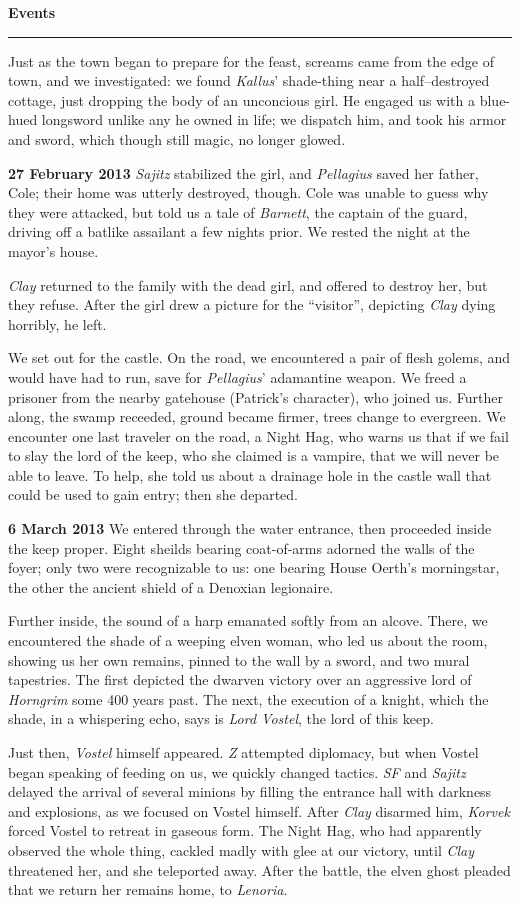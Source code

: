 \documentclass[letterpaper]{article}
\newcommand{\e}[1]{\emph{#1}}
\newcommand{\B}[1]{\textbf{#1}}
\newenvironment{notesection}[1]
{ {\huge \B{#1}}\hrule\vspace{0.5em}\begingroup\fontsize{9pt}{12pt}\selectfont}
{\endgroup}
\begin{document}
\begin{notesection}{Events}
Just as the town began to prepare for the feast, screams came from the edge of town, and we investigated: we found \e{Kallus}' shade-thing near a half--destroyed cottage, just dropping the body of an unconcious girl.  He engaged us with a blue-hued longsword unlike any he owned in life; we dispatch him, and took his armor and sword, which though still magic, no longer glowed.

\B{27 February 2013} \e{Sajitz} stabilized the girl, and \e{Pellagius} saved her father, Cole; their home was utterly destroyed, though.  Cole was unable to guess why they were attacked, but told us a tale of \e{Barnett}, the captain of the guard, driving off a batlike assailant a few nights prior. We rested the night at the mayor's house.

\e{Clay} returned to the family with the dead girl, and offered to destroy her, but they refuse.  After the girl drew a picture for the ``visitor'', depicting \e{Clay} dying horribly, he left.

We set out for the castle. On the road, we encountered a pair of flesh golems, and would have had to run, save for \e{Pellagius}' adamantine weapon.  We freed a prisoner from the nearby gatehouse (Patrick's character), who joined us.  Further along, the swamp receeded, ground became firmer, trees change to evergreen.  We encounter one last traveler on the road, a Night Hag, who warns us that if we fail to slay the lord of the keep, who she claimed is a vampire, that we will never be able to leave. To help, she told us about a drainage hole in the castle wall that could be used to gain entry; then she departed.

\B{6 March 2013} We entered through the water entrance, then proceeded inside the keep proper. Eight sheilds bearing coat-of-arms adorned the walls of the foyer; only two were recognizable to us: one bearing House Oerth's morningstar, the other the ancient shield of a Denoxian legionaire.

Further inside, the sound of a harp emanated softly from an alcove. There, we encountered the shade of a weeping elven woman, who led us about the room, showing us her own remains, pinned to the wall by a sword, and two mural tapestries.  The first depicted the dwarven victory over an aggressive lord of \e{Horngrim} some 400 years past.  The next, the execution of a knight, which the shade, in a whispering echo, says is \e{Lord Vostel}, the lord of this keep.

Just then, \e{Vostel} himself appeared. \e{Z} attempted diplomacy, but when Vostel began speaking of feeding on us, we quickly changed tactics. \e{SF} and \e{Sajitz} delayed the arrival of several minions by filling the entrance hall with darkness and explosions, as we focused on Vostel himself. After \e{Clay} disarmed him, \e{Korvek} forced Vostel to retreat in gaseous form. The Night Hag, who had apparently observed the whole thing, cackled madly with glee at our victory, until \e{Clay} threatened her, and she teleported away. After the battle, the elven ghost pleaded that we return her remains home, to \e{Lenoria}.


\end{notesection}
\end{document}
